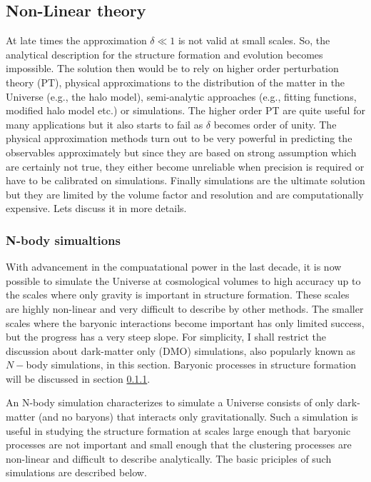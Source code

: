 \subsection{Non-Linear theory}

At late times the approximation $\delta \ll 1$ is not valid at small scales. So, the analytical
description for the structure formation and evolution becomes impossible. The solution then would 
be to rely on higher order perturbation theory (PT), physical approximations to the
distribution of the matter in the Universe (e.g., the halo model), 
semi-analytic approaches (e.g., fitting functions, modified halo model etc.) or simulations. 
The higher order PT are quite useful for many applications but it also starts to 
fail as $\delta$ becomes order of unity. The physical approximation methods turn 
out to be very powerful in predicting the observables approximately 
but since they are based on strong assumption which are 
certainly not true, they either become unreliable when precision is required or have
to be calibrated on simulations. Finally simulations are the ultimate solution but they
are limited by the volume factor and resolution and are computationally expensive. 
Lets discuss it in more details. 

\subsubsection{N-body simualtions}

With advancement in the compuatational power in the last decade, it is now possible to
simulate the Universe at cosmological volumes to high accuracy up to the scales where
only gravity is important in structure formation. These scales are highly non-linear and
very difficult to describe by other methods. The smaller scales where the baryonic
interactions become important has only limited success, but the progress has a very
steep slope. For simplicity, I shall restrict the discussion about dark-matter only (DMO)
simulations, also popularly known as $N-$body simulations,
in this section. Baryonic processes in structure formation will be discussed in section \ref{}.

An N-body simulation
characterizes to simulate a Universe consists of only dark-matter (and no baryons) that 
interacts only gravitationally. Such a simulation is useful in studying the
structure formation at scales large enough that baryonic processes are not 
important and small enough that the clustering processes are non-linear and difficult
to describe analytically. The basic priciples of such simulations are described below.

